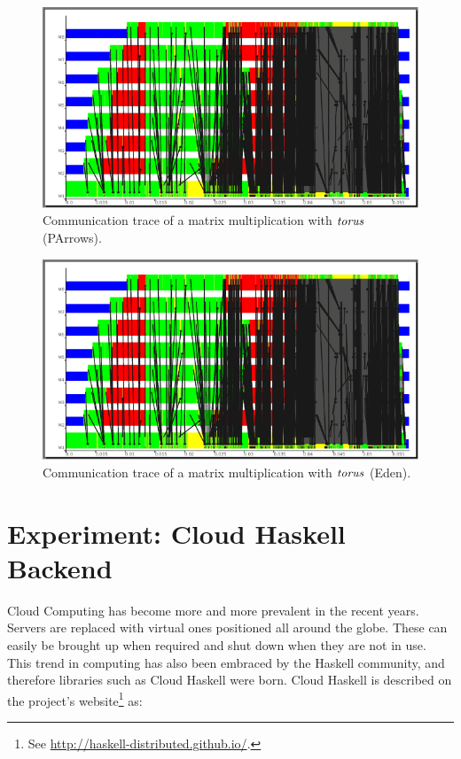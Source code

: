 \documentclass[paper=A4,twoside=true,openright,parskip=full,chapterprefix=true,headings=normal,bibliography=totoc,listof=totoc,titlepage=on,captions=tableabove,draft=false,british]{scrreprt}%
\begin{document}
\begin{figure}
\centering
\includegraphics{src/img/torus_matrix_parrows_trace.pdf}
\caption{Communication trace of a matrix multiplication with \ensuremath{\Varid{torus}}
(PArrows).\label{fig:torus_parrows_trace}}
\end{figure}

\begin{figure}
\centering
\includegraphics{src/img/torus_matrix_parrows_trace.pdf}
\caption{Communication trace of a matrix multiplication with \ensuremath{\Varid{torus}}
(Eden).\label{fig:torus_eden_trace}}
\end{figure}

\hypertarget{experiment-cloud-haskell-backend}{%
\chapter{Experiment: Cloud Haskell
Backend}\label{experiment-cloud-haskell-backend}}

\label{sec:cloudHaskellExperiment}

Cloud Computing has become more and more prevalent in the recent years.
Servers are replaced with virtual ones positioned all around the globe.
These can easily be brought up when required and shut down when they are
not in use. This trend in computing has also been embraced by the
Haskell community, and therefore libraries such as Cloud Haskell were
born. Cloud Haskell is described on the project's website\footnote{See
  \url{http://haskell-distributed.github.io/}.} as:
\end{document}
